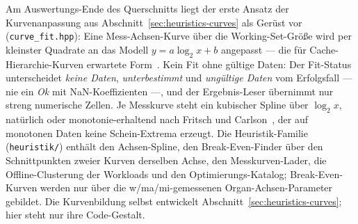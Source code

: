 \begin{nurkurz}
Am Auswertungs-Ende des Querschnitts liegt der erste Ansatz der Kurvenanpassung aus
Abschnitt~\ref{sec:heuristics-curves} als Gerüst vor (\texttt{curve\_fit.hpp}): Eine Mess-Achsen-Kurve
über die Working-Set-Größe wird per kleinster Quadrate an das Modell $y = a\log_2 x + b$ angepasst --- die
für Cache-Hierarchie-Kurven erwartete Form~\cite{hill1989associativity}. Kein Fit ohne gültige Daten: Der
Fit-Status unterscheidet \emph{keine Daten}, \emph{unterbestimmt} und \emph{ungültige Daten} vom
Erfolgsfall --- nie ein \emph{Ok} mit NaN-Koeffizienten ---, und der Ergebnis-Leser übernimmt nur streng
numerische Zellen. Je Messkurve steht ein kubischer Spline über $\log_2 x$, natürlich oder
monotonie-erhaltend nach Fritsch und Carlson~\cite{fritsch1980monotone}, der auf monotonen Daten keine
Schein-Extrema erzeugt. Die Heuristik-Familie (\texttt{heuristik/}) enthält den Achsen-Spline, den
Break-Even-Finder über den Schnittpunkten zweier Kurven derselben Achse, den Messkurven-Lader, die
Offline-Clusterung der Workloads und den Optimierungs-Katalog; Break-Even-Kurven werden nur über die
w/ma/mi-gemessenen Organ-Achsen-Parameter gebildet. Die Kurvenbildung selbst entwickelt
Abschnitt~\ref{sec:heuristics-curves}; hier steht nur ihre Code-Gestalt.
\end{nurkurz}

